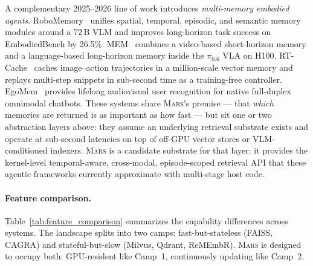\documentclass[11pt]{article}
\newcommand{\mars}{\textsc{Mars}}
\begin{document}
A complementary 2025--2026 line of work introduces \emph{multi-memory
embodied agents}. RoboMemory~\cite{robomemory} unifies spatial,
temporal, episodic, and semantic memory modules around a 72\,B VLM
and improves long-horizon task success on EmbodiedBench by 26.5\%.
MEM~\cite{mem_pi06} combines a video-based short-horizon memory and
a language-based long-horizon memory inside the $\pi_{0.6}$ VLA on
H100. RT-Cache~\cite{rt_cache} caches image--action trajectories in
a million-scale vector memory and replays multi-step snippets in
sub-second time as a training-free controller. EgoMem~\cite{egomem}
provides lifelong audiovisual user recognition for native full-duplex
omnimodal chatbots. These systems share \mars{}'s premise --- that
\emph{which} memories are returned is as important as how fast --- but
sit one or two abstraction layers above: they assume an underlying
retrieval substrate exists and operate at sub-second latencies on top
of off-GPU vector stores or VLM-conditioned indexers. \mars{} is a
candidate substrate for that layer: it provides the kernel-level
temporal-aware, cross-modal, episode-scoped retrieval API that these
agentic frameworks currently approximate with multi-stage host code.

\paragraph{Feature comparison.}
Table~\ref{tab:feature_comparison} summarizes the capability differences
across systems. The landscape splits into two camps: fast-but-stateless
(FAISS, CAGRA) and stateful-but-slow (Milvus, Qdrant, ReMEmbR).
\mars{} is designed to occupy both: GPU-resident like Camp~1,
continuously updating like Camp~2.
\end{document}
